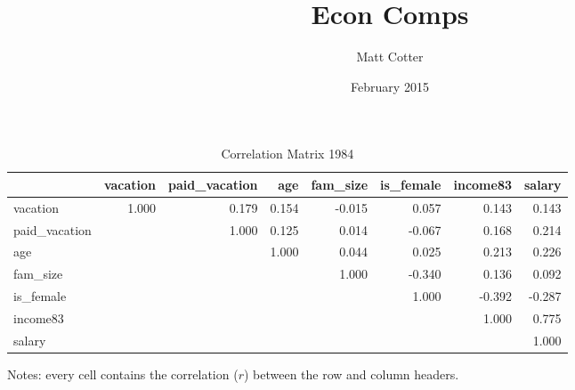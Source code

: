 \documentclass{article}
\title{Econ Comps}
\author{Matt Cotter}
\date{February 2015}
\begin{document}
    \begin{table}[h]
    \centering
    \hspace*{-1.5cm}
    \begin{tabular}{l|r|r|r|r|r|r|r}
                     & vacation & paid\_vacation &   age & fam\_size & is\_female & income83 & salary \\ \hline
      vacation       &    1.000 &          0.179 & 0.154 &    -0.015 &      0.057 &    0.143 &  0.143 \\ \hline
      paid\_vacation &          &          1.000 & 0.125 &     0.014 &     -0.067 &    0.168 &  0.214 \\ \hline
      age            &          &                & 1.000 &     0.044 &      0.025 &    0.213 &  0.226 \\ \hline
      fam\_size      &          &                &       &     1.000 &     -0.340 &    0.136 &  0.092 \\ \hline
      is\_female     &          &                &       &           &      1.000 &   -0.392 & -0.287 \\ \hline
      income83       &          &                &       &           &            &    1.000 &  0.775 \\ \hline
      salary         &          &                &       &           &            &          &  1.000
    \end{tabular}
    \hspace*{-1.5cm}
    \caption{Correlation Matrix 1984}
    \label{1984-correlation}
      Notes: every cell contains the correlation ($r$) between the row and column headers.
    \end{table}
\end{document}
